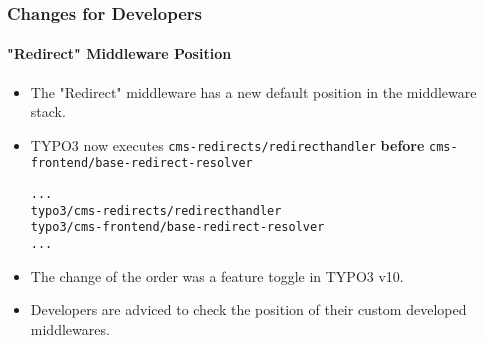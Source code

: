 %

\begin{frame}[fragile]
	\frametitle{Changes for Developers}
	\framesubtitle{"Redirect" Middleware Position}


	\begin{itemize}
		\item The "Redirect" middleware has a new default position in the middleware stack.
		\item TYPO3 now executes
			\small\texttt{cms-redirects/redirecthandler}\normalsize\newline
			\textbf{before}
			\texttt{cms-frontend/base-redirect-resolver}\normalsize
\begin{lstlisting}
...
typo3/cms-redirects/redirecthandler
typo3/cms-frontend/base-redirect-resolver
...
\end{lstlisting}

		\item The change of the order was a feature toggle in TYPO3 v10.
		\item Developers are adviced to check the position of their custom developed middlewares.

	\end{itemize}

\end{frame}

